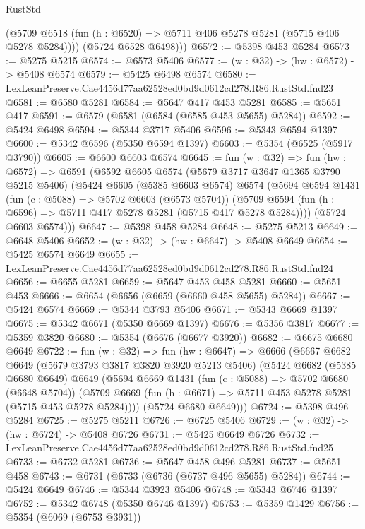 \begin{lexlean}{RustStd}
\begin{coremodule}
          (@5709 @6518 (fun (h : @6520) => @5711 @406 @5278 @5281 (@5715 @406 @5278 @5284))))
        (@5724 @6528 @6498)))
@6572 := @5398 @453 @5284
@6573 := @5275 @5215
@6574 := @6573 @5406
@6577 := (w : @32) -> (hw : @6572) -> @5408 @6574
@6579 := @5425 @6498 @6574
@6580 := LexLeanPreserve.Cae4456d77aa62528ed0bd9d0612cd278.R86.RustStd.fnd23
@6581 := @6580 @5281
@6584 := @5647 @417 @453 @5281
@6585 := @5651 @417
@6591 := @6579 (@6581 (@6584 (@6585 @453 @5655) @5284))
@6592 := @5424 @6498
@6594 := @5344 @3717 @5406
@6596 := @5343 @6594 @1397
@6600 := @5342 @6596 (@5350 @6594 @1397)
@6603 := @5354 (@6525 (@5917 @3790))
@6605 := @6600 @6603 @6574
@6645 := fun (w : @32) =>
  fun (hw : @6572) =>
  @6591
    (@6592
      @6605
      @6574
      (@5679 @3717 @3647 @1365 @3790 @5215 @5406)
      (@5424
        @6605
        (@5385 @6603 @6574)
        @6574
        (@5694
          @6594
          @1431
          (fun (c : @5088) => @5702 @6603 (@6573 @5704))
          (@5709 @6594 (fun (h : @6596) => @5711 @417 @5278 @5281 (@5715 @417 @5278 @5284))))
        (@5724 @6603 @6574)))
@6647 := @5398 @458 @5284
@6648 := @5275 @5213
@6649 := @6648 @5406
@6652 := (w : @32) -> (hw : @6647) -> @5408 @6649
@6654 := @5425 @6574 @6649
@6655 := LexLeanPreserve.Cae4456d77aa62528ed0bd9d0612cd278.R86.RustStd.fnd24
@6656 := @6655 @5281
@6659 := @5647 @453 @458 @5281
@6660 := @5651 @453
@6666 := @6654 (@6656 (@6659 (@6660 @458 @5655) @5284))
@6667 := @5424 @6574
@6669 := @5344 @3793 @5406
@6671 := @5343 @6669 @1397
@6675 := @5342 @6671 (@5350 @6669 @1397)
@6676 := @5356 @3817
@6677 := @5359 @3820
@6680 := @5354 (@6676 (@6677 @3920))
@6682 := @6675 @6680 @6649
@6722 := fun (w : @32) =>
  fun (hw : @6647) =>
  @6666
    (@6667
      @6682
      @6649
      (@5679 @3793 @3817 @3820 @3920 @5213 @5406)
      (@5424
        @6682
        (@5385 @6680 @6649)
        @6649
        (@5694
          @6669
          @1431
          (fun (c : @5088) => @5702 @6680 (@6648 @5704))
          (@5709 @6669 (fun (h : @6671) => @5711 @453 @5278 @5281 (@5715 @453 @5278 @5284))))
        (@5724 @6680 @6649)))
@6724 := @5398 @496 @5284
@6725 := @5275 @5211
@6726 := @6725 @5406
@6729 := (w : @32) -> (hw : @6724) -> @5408 @6726
@6731 := @5425 @6649 @6726
@6732 := LexLeanPreserve.Cae4456d77aa62528ed0bd9d0612cd278.R86.RustStd.fnd25
@6733 := @6732 @5281
@6736 := @5647 @458 @496 @5281
@6737 := @5651 @458
@6743 := @6731 (@6733 (@6736 (@6737 @496 @5655) @5284))
@6744 := @5424 @6649
@6746 := @5344 @3923 @5406
@6748 := @5343 @6746 @1397
@6752 := @5342 @6748 (@5350 @6746 @1397)
@6753 := @5359 @1429
@6756 := @5354 (@6069 (@6753 @3931))

\end{coremodule}
\end{lexlean}
